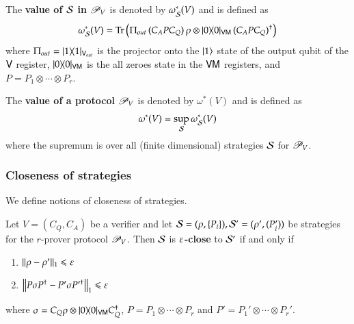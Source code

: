 The \textbf{value of $\mathcal{S}$ in $\mathscr{P}_V$} is denoted by $\omega^*_{\mathcal{S}}(V)$ and is defined as
\[
	\omega^*_{\mathcal{S}}(V) = \operatorname{Tr} \left( \Pi_{out} \, ( C_A P C_Q) \, \rho \otimes |0\rangle\! \langle 0|_{{\mathsf{V}} {\mathsf{M}}} \, (C_A P C_Q)^\dagger\right)
\]
where $\Pi_{out} = |1\rangle\! \langle 1|_{{\mathsf{V}}_{out}}$ is the projector onto the $|1\rangle$ state of the output qubit of the ${\mathsf{V}}$ register, $|0\rangle\! \langle 0|_{{\mathsf{V}} {\mathsf{M}}}$ is the all zeroes state in the ${\mathsf{V}} {\mathsf{M}}$ registers, and $P = P_1 \otimes \cdots \otimes P_r$. 


The \textbf{value of a protocol $\mathscr{P}_V$} is denoted by $\omega^*(V)$ and is defined as 
\[
	\omega^*(V) = \sup_{\mathcal{S}} \omega^*_{\mathcal{S}}(V)
\]
where the supremum is over all (finite dimensional) strategies $\mathcal{S}$ for $\mathscr{P}_V$. 



\subsubsection{Closeness of strategies} 

We define notions of closeness of strategies. 
%

\begin{definition}
	Let $V = (C_Q,C_A)$ be a verifier and let $\mathcal{S} = (\rho,\{P_i\}), \mathcal{S}' = (\rho',(P_i'))$ be strategies for the $r$-prover protocol $\mathscr{P}_V$. Then $\mathcal{S}$ is \textbf{$\varepsilon$-close} to $\mathcal{S}'$ if and only if
	\begin{enumerate}
		\item $ \lVert \rho - \rho'\rVert_1 \leqslant \varepsilon$
		\item $\left\lVert P \sigma P^\dagger - P' \sigma P'^\dagger \right\rVert_1 \leqslant \varepsilon$		
		
	\end{enumerate}
where $\sigma = C_Q \rho \otimes |0\rangle\! \langle 0|_{{\mathsf{V}} {\mathsf{M}}} C_Q^\dagger$, $P = P_1 \otimes \cdots \otimes P_r$ and $P' = P_1' \otimes \cdots \otimes P_r'$.

\end{definition}

